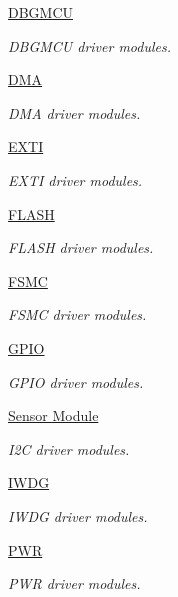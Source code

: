 \begin{DoxyCompactItemize}
\hyperlink{group___d_b_g_m_c_u}{D\-B\-G\-M\-C\-U}
\begin{DoxyCompactList}\small\item\em D\-B\-G\-M\-C\-U driver modules. \end{DoxyCompactList}\item 
\hyperlink{group___d_m_a}{D\-M\-A}
\begin{DoxyCompactList}\small\item\em D\-M\-A driver modules. \end{DoxyCompactList}\item 
\hyperlink{group___e_x_t_i}{E\-X\-T\-I}
\begin{DoxyCompactList}\small\item\em E\-X\-T\-I driver modules. \end{DoxyCompactList}\item 
\hyperlink{group___f_l_a_s_h}{F\-L\-A\-S\-H}
\begin{DoxyCompactList}\small\item\em F\-L\-A\-S\-H driver modules. \end{DoxyCompactList}\item 
\hyperlink{group___f_s_m_c}{F\-S\-M\-C}
\begin{DoxyCompactList}\small\item\em F\-S\-M\-C driver modules. \end{DoxyCompactList}\item 
\hyperlink{group___g_p_i_o}{G\-P\-I\-O}
\begin{DoxyCompactList}\small\item\em G\-P\-I\-O driver modules. \end{DoxyCompactList}\item 
\hyperlink{group___i2_c}{Sensor Module}
\begin{DoxyCompactList}\small\item\em I2\-C driver modules. \end{DoxyCompactList}\item 
\hyperlink{group___i_w_d_g}{I\-W\-D\-G}
\begin{DoxyCompactList}\small\item\em I\-W\-D\-G driver modules. \end{DoxyCompactList}\item 
\hyperlink{group___p_w_r}{P\-W\-R}
\begin{DoxyCompactList}\small\item\em P\-W\-R driver modules. \end{DoxyCompactList}\item 

\end{DoxyCompactItemize}
